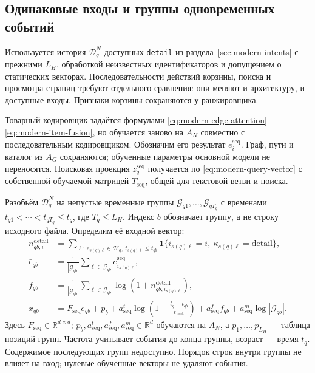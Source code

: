 \documentclass[12pt,a4paper]{article}
\newcommand{\code}[1]{{\ttfamily\small\nolinkurl{#1}}}
\newcommand{\R}{\mathbb R}
\newcommand{\ind}{\mathbf 1}
\theoremstyle{plainru}
\begin{document}
\subsection{Одинаковые входы и группы одновременных событий}
\label{sec:sequence-input}

Используется история $\mathcal D_q^N$ доступных \code{detail}
из раздела~\ref{sec:modern-intents} с прежними $L_H$, обработкой
неизвестных идентификаторов и допущением о статических векторах.
Последовательности действий корзины, поиска и просмотра страниц
требуют отдельного сравнения: они меняют и архитектуру, и доступные входы.
Признаки корзины сохраняются у ранжировщика.

Товарный кодировщик задаётся формулами
\eqref{eq:modern-edge-attention}--\eqref{eq:modern-item-fusion},
но обучается заново на $A_N$ совместно с последовательным кодировщиком.
Обозначим его результат $e_i^{\mathrm{seq}}$.
Граф, пути и каталог из $A_G$ сохраняются; обученные параметры
основной модели не переносятся. Поисковая проекция $z_q^{\mathrm{seq}}$ получается по
\eqref{eq:modern-query-vector} с собственной обучаемой матрицей
$T_{\mathrm{seq}}$, общей для текстовой ветви и поиска.

Разобьём $\mathcal D_q^N$ на непустые временные группы
$\mathcal G_{q1},\ldots,\mathcal G_{qT_q}$ с временами
$t_{q1}<\cdots<t_{qT_q}\le t_q$, где $T_q\le L_H$.
Индекс $b$ обозначает группу, а не строку исходного файла.
Определим её входной вектор:
\begin{align}\label{eq:sequence-token}
n_{qb,i}^{\mathrm{detail}}
&=\sum_{\ell:\,e_{s(q)\ell}\in\mathcal H_q,\ t_{s(q)\ell}\le t_{qb}}
\ind\{i_{s(q)\ell}=i,\ \kappa_{s(q)\ell}=\mathrm{detail}\},\\
\bar e_{qb}&=\frac1{|\mathcal G_{qb}|}
\sum_{\ell\in\mathcal G_{qb}}e_{i_{s(q)\ell}}^{\mathrm{seq}},\nonumber\\
f_{qb}&=\frac1{|\mathcal G_{qb}|}
\sum_{\ell\in\mathcal G_{qb}}
\log(1+n_{qb,i_{s(q)\ell}}^{\mathrm{detail}}),\nonumber\\
x_{qb}&=F_{\mathrm{seq}}\bar e_{qb}+p_b
+a_{\mathrm{seq}}^t
\log\!\left(1+\frac{t_q-t_{qb}}{t_{\mathrm{unit}}}\right)
+a_{\mathrm{seq}}^f f_{qb}
+a_{\mathrm{seq}}^m\log|\mathcal G_{qb}|.\nonumber
\end{align}
Здесь $F_{\mathrm{seq}}\in\R^{d\times d}$;
$p_b,a_{\mathrm{seq}}^t,a_{\mathrm{seq}}^f,a_{\mathrm{seq}}^m\in\R^d$
обучаются на $A_N$, а $p_1,\ldots,p_{L_H}$ --- таблица позиций групп.
Частота учитывает события до конца группы, возраст --- время $t_q$.
Содержимое последующих групп недоступно. Порядок строк внутри группы
не влияет на вход; нулевые обученные векторы не удаляют события.
\end{document}
